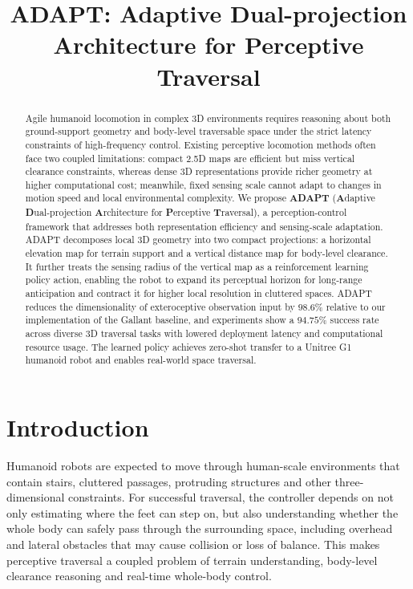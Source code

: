 \documentclass[letterpaper, 10 pt, conference]{ieeeconf/ieeeconf}
\title{\LARGE \bf
ADAPT: Adaptive Dual-projection Architecture for Perceptive Traversal 
}
\DeclareRobustCommand{\RevisionAdd}[1]{{\color{red}#1}}
\begin{document}
\maketitle
\thispagestyle{empty}
\pagestyle{empty}

\begin{abstract}
% 
% 
Agile humanoid locomotion in complex 3D environments requires reasoning about both ground-support geometry and body-level traversable space under the strict latency constraints of high-frequency control. Existing perceptive locomotion methods often face two coupled limitations: compact 2.5D maps are efficient but miss vertical clearance constraints, whereas dense 3D representations provide richer geometry at higher computational cost; meanwhile, fixed sensing scale cannot adapt to changes in motion speed and local environmental complexity. We propose \textbf{ADAPT} (\textbf{A}daptive \textbf{D}ual-projection \textbf{A}rchitecture for \textbf{P}erceptive \textbf{T}raversal), a perception-control framework that addresses both representation efficiency and sensing-scale adaptation. ADAPT decomposes local 3D geometry into two compact projections: a horizontal elevation map for terrain support and a vertical distance map for body-level clearance. It further treats the sensing radius of the vertical map as a reinforcement learning policy action, enabling the robot to expand its perceptual horizon for long-range anticipation and contract it for higher local resolution in cluttered spaces. \RevisionAdd{ADAPT reduces the dimensionality of exteroceptive observation input by $98.6\%$ relative to our implementation of the Gallant baseline, and experiments show a $94.75\%$ success rate across diverse 3D traversal tasks with lowered deployment latency and computational resource usage}. The learned policy achieves zero-shot transfer to a Unitree G1 humanoid robot and enables real-world space traversal.
\end{abstract}    
\section{Introduction}
Humanoid robots are expected to move through human-scale environments that contain stairs, cluttered passages, protruding structures and other three-dimensional constraints. For successful traversal, the controller depends on not only estimating where the feet can step on, but also understanding whether the whole body can safely pass through the surrounding space, including overhead and lateral obstacles that may cause collision or loss of balance. This makes perceptive traversal a coupled problem of terrain understanding, body-level clearance reasoning and real-time whole-body control.
\end{document}
